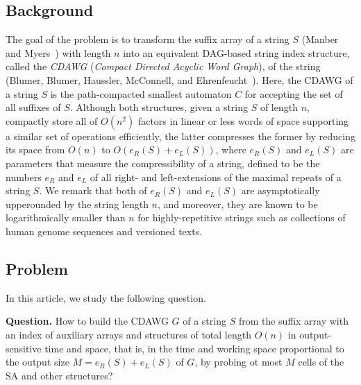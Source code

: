 \documentclass{article}
\begin{document}
\subsection{Background}
The goal of the problem is to transform the suffix array of a string $S$ (Manber and Myers~\cite{manber:myers1993suffixarrays}) with length $n$ into an equivalent DAG-based string index structure, called the \textit{CDAWG} (\textit{Compact Directed Acyclic Word Graph}), of the string (Blumer, Blumer, Haussler, McConnell, and Ehrenfeucht~\cite{blumer1987complete}). Here, the CDAWG of a string $S$ is the path-compacted smallest automaton $C$ for accepting the set of all suffixes of $S$.
Although both structures, given a string $S$ of length $n$, compactly%
store all of $O(n^2)$ factors in linear or less words of space supporting a similar set of operations efficiently, the latter compresses the former by reducing its space from $O(n)$ to $O({e_R(S) + e_L(S)})$, where $e_R(S)$ and $e_L(S)$ are parameters that measure the compressibility of a string, defined to be the numbers $e_R$ and $e_L$ of all right- and left-extensions of the maximal repeats of a string $S$. We remark that both of $e_R(S)$ and $e_L(S)$ are asymptotically upperounded by the string length $n$, and moreover, they are known to be logarithmically smaller than $n$ for highly-repetitive strings such as collections of human genome sequences and versioned texts. 

\subsection{Problem}
In this article, we study the following question. 

\begin{trivlist}{\item[] \noindent \textbf{Question.}
How to build the CDAWG $G$ of a string $S$ from the suffix array with an index of auxiliary arrays and structures of total length $O(n)$ in output-sensitive time and space, that is, in the time and working space proportional to the output size $M = {e_R(S) + e_L(S)}$ of $G$, by probing ot most $M$ cells of the SA and other structures?
}\end{trivlist}
\end{document}
